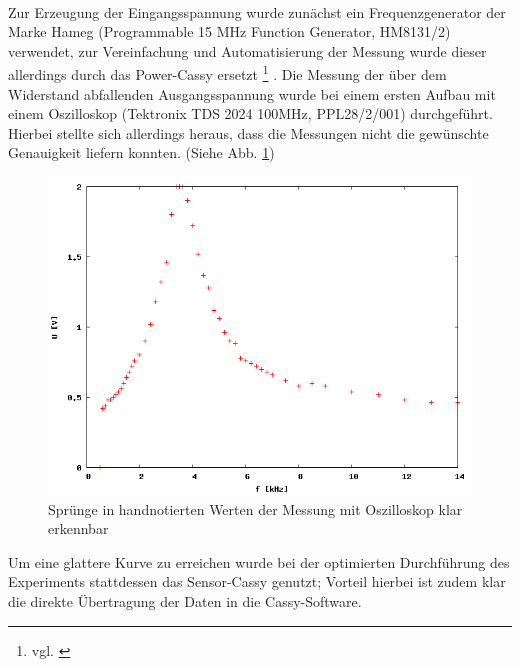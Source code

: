 \paragraph{}
Zur Erzeugung der Eingangsspannung wurde zunächst ein Frequenzgenerator der Marke Hameg (Programmable 15 MHz Function Generator, HM8131/2) verwendet, zur Vereinfachung und Automatisierung der Messung wurde dieser allerdings durch das Power-Cassy ersetzt \footnote{vgl. \cite[42f.]{cassy2013manual}} .
Die Messung der über dem Widerstand abfallenden Ausgangsspannung wurde bei einem ersten Aufbau mit einem Oszilloskop (Tektronix TDS 2024 100MHz, PPL28/2/001) durchgeführt. Hierbei stellte sich allerdings heraus, dass die Messungen nicht die gewünschte Genauigkeit liefern konnten. (Siehe Abb. \ref{plot:oszi})
\begin{figure}
	\includegraphics[width=.9\textwidth]{images/plot/oszi.png}
\caption{Sprünge in handnotierten Werten der Messung mit Oszilloskop klar erkennbar}
\label{plot:oszi}
\end{figure}
Um eine glattere Kurve zu erreichen wurde bei der optimierten Durchführung des Experiments stattdessen das Sensor-Cassy genutzt; Vorteil hierbei ist zudem klar die direkte Übertragung der Daten in die Cassy-Software.

